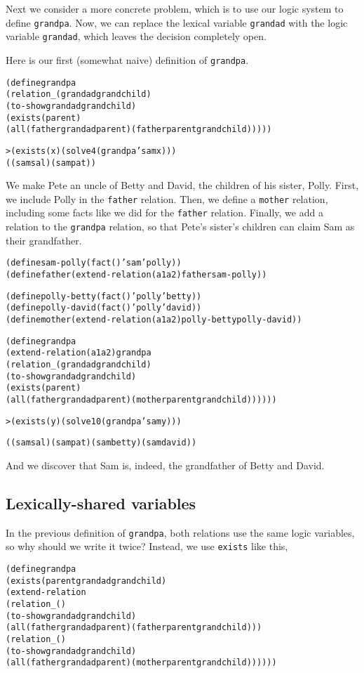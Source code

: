 Next we consider a more concrete problem, which is to use our logic
system to define \texttt{grandpa}.  Now, we can replace the lexical
variable \texttt{grandad} with the logic variable \texttt{grandad},
which leaves the decision completely open.  

Here is our first (somewhat naive) definition of \texttt{grandpa}.

\begin{alltt}
(define grandpa
  (relation _ (grandad grandchild)
    (to-show grandad grandchild)
    (exists (parent)
      (all (father grandad parent) (father parent grandchild)))))

> (exists (x) (solve 4 (grandpa 'sam x)))
((sam sal) (sam pat))
\end{alltt}

We make Pete an uncle of Betty and David, the children of his sister,
Polly.  First, we include Polly in the \texttt{father} relation.
Then, we define a \texttt{mother} relation, including some facts like
we did for the \texttt{father} relation.  Finally, we add a relation
to the \texttt{grandpa} relation, so that Pete's sister's children can
claim Sam as their grandfather.

\begin{alltt}
(define sam-polly (fact () 'sam 'polly))
(define father (extend-relation (a1 a2) father sam-polly))
\end{alltt}

\begin{alltt}
(define polly-betty (fact () 'polly 'betty))
(define polly-david (fact () 'polly 'david))
(define mother (extend-relation (a1 a2) polly-betty polly-david))
\end{alltt}

\begin{alltt}
(define grandpa
  (extend-relation (a1 a2) grandpa
    (relation _ (grandad grandchild)
      (to-show grandad grandchild)
      (exists (parent)
        (all (father grandad parent) (mother parent grandchild))))))
\end{alltt}

\begin{alltt}  
> (exists (y) (solve 10 (grandpa 'sam y)))

((sam sal) (sam pat) (sam betty) (sam david))
\end{alltt}

\noindent
And we discover that Sam is, indeed, the grandfather of
Betty and David.

\subsection{Lexically-shared variables}
In the previous definition of \texttt{grandpa}, both relations use the
same logic variables, so why should we write it twice?
Instead, we use \texttt{exists} like this,
\begin{alltt}
(define grandpa
  (exists (parent grandad grandchild)
    (extend-relation
      (relation _ ()
        (to-show grandad grandchild)
        (all (father grandad parent) (father parent grandchild)))
      (relation _ ()
        (to-show grandad grandchild)
        (all (father grandad parent) (mother parent grandchild))))))
\end{alltt}

